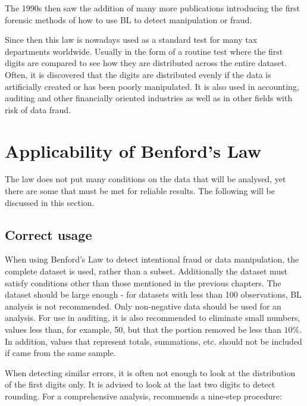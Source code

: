 The 1990s then saw the addition of many more publications %
introducing the first forensic methods of how to use BL to detect manipulation or fraud. \cite{kossovsky2014benford} %

Since then this law is nowadays used as a standard test for many tax departments worldwide. Usually in the form of a routine test where the first digits are compared to see how they are distributed across the entire dataset. Often, it is discovered that the digits are distributed evenly if the data is artificially created or has been poorly manipulated. It is also used in accounting, auditing and other financially oriented industries as well as in other fields with risk of data fraud. \cite{kossovsky2014benford} %

\section{Applicability of Benford's Law}

The law does not put many conditions on the data that will be analysed, yet there are some that must be met for reliable results. The following will be discussed in this section. 

\subsection{Correct usage}

When using Benford's Law to detect intentional fraud or data manipulation, the complete dataset is used, rather than a subset. Additionally the dataset must satisfy conditions other than those mentioned in the previous chapters. The dataset should be large enough - for datasets with less than 100 observations, BL analysis is not recommended. %
Only non-negative data should be used for an analysis. For use in auditing, it is also recommended to eliminate small numbers, values less than, for example, 50, but that the portion removed be less than $10\%$. In addition, values that represent totals, summations, etc. should not be included if came from the same sample. \cite{kossovsky2014benford} %

When detecting similar errors, it is often not enough to look at the distribution of the first digits only. It is advised to look at the last two digits to detect rounding. For a comprehensive analysis, \citeauthor{kossovsky2014benford} recommends a nine-step procedure:

